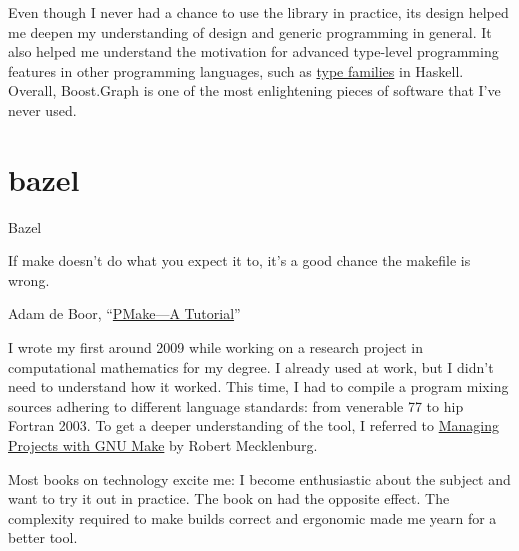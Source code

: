 \documentclass{article}
\begin{document}
Even though I never had a chance to use the library in practice, its design helped me deepen my understanding of \href{https://en.wikipedia.org/wiki/Standard_Template_Library}{} design and generic programming in general.
It also helped me understand the motivation for advanced type-level programming features in other programming languages, such as \href{https://wiki.haskell.org/GHC/Type_families}{type families} in Haskell.
Overall, Boost.Graph is one of the most enlightening pieces of software that I've never used.

\section{bazel}{Bazel}

\epigraph{
  If make doesn't do what you expect it to, it's a good chance the makefile is wrong.
}{
  Adam de Boor, ``\href{https://docs-archive.freebsd.org/44doc/psd/12.make/paper.pdf}{PMake---A Tutorial}''
}

I wrote my first  around 2009 while working on a research project in computational mathematics for my degree.
I already used \href{https://en.wikipedia.org/wiki/Make_(software)}{} at work, but I didn't need to understand how it worked.
This time, I had to compile a  program mixing sources adhering to different language standards: from venerable  77 to hip Fortran 2003.
To get a deeper understanding of the tool, I referred to \href{https://www.oreilly.com/library/view/managing-projects-with/0596006101/}{Managing Projects with GNU Make} by Robert Mecklenburg.

Most books on technology excite me: I become enthusiastic about the subject and want to try it out in practice. 
The book on  had the opposite effect.
The complexity required to make builds correct and ergonomic made me yearn for a better tool.
\end{document}
